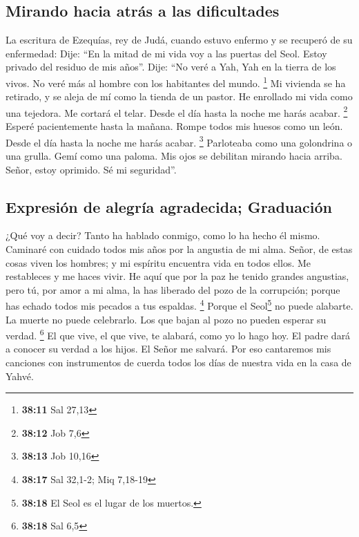 \begin{paracol}{2}
\hypertarget{mirando-hacia-atruxe1s-a-las-dificultades}{%
\subsection{Mirando hacia atrás a las
dificultades}\label{mirando-hacia-atruxe1s-a-las-dificultades}}

 La escritura de Ezequías, rey de Judá, cuando estuvo
enfermo y se recuperó de su enfermedad:  Dije: ``En la
mitad de mi vida voy a las puertas del Seol. Estoy privado del residuo
de mis años''.  Dije: ``No veré a Yah, Yah en la tierra
de los vivos. No veré más al hombre con los habitantes del mundo.
\footnote{\textbf{38:11} Sal 27,13}  Mi vivienda se ha
retirado, y se aleja de mí como la tienda de un pastor. He enrollado mi
vida como una tejedora. Me cortará el telar. Desde el día hasta la noche
me harás acabar. \footnote{\textbf{38:12} Job 7,6} 
Esperé pacientemente hasta la mañana. Rompe todos mis huesos como un
león. Desde el día hasta la noche me harás acabar. \footnote{\textbf{38:13}
  Job 10,16}  Parloteaba como una golondrina o una
grulla. Gemí como una paloma. Mis ojos se debilitan mirando hacia
arriba. Señor, estoy oprimido. Sé mi seguridad''.

\hypertarget{expresiuxf3n-de-alegruxeda-agradecida-graduaciuxf3n}{%
\subsection{Expresión de alegría agradecida;
Graduación}\label{expresiuxf3n-de-alegruxeda-agradecida-graduaciuxf3n}}

 ¿Qué voy a decir? Tanto ha hablado conmigo, como lo ha
hecho él mismo. Caminaré con cuidado todos mis años por la angustia de
mi alma.  Señor, de estas cosas viven los hombres; y mi
espíritu encuentra vida en todos ellos. Me restableces y me haces vivir.
 He aquí que por la paz he tenido grandes angustias, pero
tú, por amor a mi alma, la has liberado del pozo de la corrupción;
porque has echado todos mis pecados a tus espaldas. \footnote{\textbf{38:17}
  Sal 32,1-2; Miq 7,18-19}  Porque el Seol\footnote{\textbf{38:18}
  El Seol es el lugar de los muertos.} no puede alabarte. La muerte no
puede celebrarlo. Los que bajan al pozo no pueden esperar su verdad.
\footnote{\textbf{38:18} Sal 6,5}  El que vive, el que
vive, te alabará, como yo lo hago hoy. El padre dará a conocer su verdad
a los hijos.  El Señor me salvará. Por eso cantaremos mis
canciones con instrumentos de cuerda todos los días de nuestra vida en
la casa de Yahvé.


\end{paracol}
